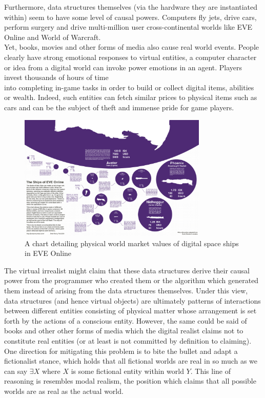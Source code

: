   Furthermore, data structures themselves (via the hardware they are instantiated within) seem to have some level of causal powers. Computers fly jets, drive cars, perform surgery and drive multi-million user cross-continental worlds like EVE Online and World of Warcraft. \\
  Yet, books, movies and other forms of media also cause real world events. People clearly have strong emotional responses to virtual entities, a computer character or idea from a digital world can invoke power emotions in an agent. Players invest thousands of hours of time \\
  into completing in-game tasks in order to build or collect digital items, abilities or wealth. Indeed, such entities can fetch similar prices to physical items such as cars and can be the subject of theft and immense pride for game players. \cite{EVEArticle}
   

  
  \begin{figure}[ht!]
  	\centering
  	\includegraphics[width=90mm]{4339410221_12d667f5b1_o.png}
  	\caption{A chart detailing physical world market values of digital space ships in EVE Online \label{overflow}}
  	\label{fig:FF7}
  \end{figure}
  	
  The virtual irrealist might claim that these data structures derive their causal power from the programmer who created them or the algorithm which generated them instead of arising from the data structures themselves. Under this view, data structures (and hence virtual objects) are ultimately patterns of interactions between different entities consisting of physical matter whose arrangement is set forth by the actions of a conscious entity. However, the same could be said of books and other other forms of media which the digital realist claims not to constitute real entities (or at least is not committed by definition to claiming). One direction for mitigating this problem is to bite the bullet and adapt a fictionalist stance, which holds that all fictional worlds are real in so much as we can say $\exists X$ where $X$ is some fictional entity within world $Y$. This line of reasoning is resembles modal realism, the position which claims that all possible worlds are as real as the actual world.\cite{lewis1986on} 
 \\
 
